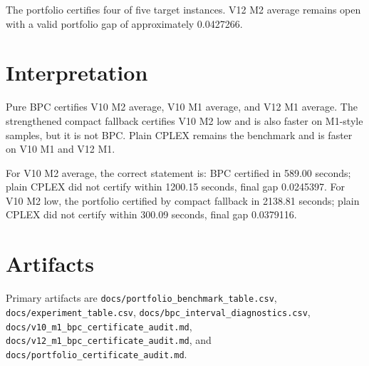 \documentclass{article}
\begin{document}
The portfolio certifies four of five target instances. V12 M2 average remains open with a valid portfolio gap of approximately 0.0427266.

\section{Interpretation}

Pure BPC certifies V10 M2 average, V10 M1 average, and V12 M1 average. The strengthened compact fallback certifies V10 M2 low and is also faster on M1-style samples, but it is not BPC. Plain CPLEX remains the benchmark and is faster on V10 M1 and V12 M1.

For V10 M2 average, the correct statement is: BPC certified in 589.00 seconds; plain CPLEX did not certify within 1200.15 seconds, final gap 0.0245397. For V10 M2 low, the portfolio certified by compact fallback in 2138.81 seconds; plain CPLEX did not certify within 300.09 seconds, final gap 0.0379116.

\section{Artifacts}

Primary artifacts are \texttt{docs/portfolio\_benchmark\_table.csv}, \texttt{docs/experiment\_table.csv}, \texttt{docs/bpc\_interval\_diagnostics.csv}, \texttt{docs/v10\_m1\_bpc\_certificate\_audit.md}, \texttt{docs/v12\_m1\_bpc\_certificate\_audit.md}, and \texttt{docs/portfolio\_certificate\_audit.md}.
\end{document}
